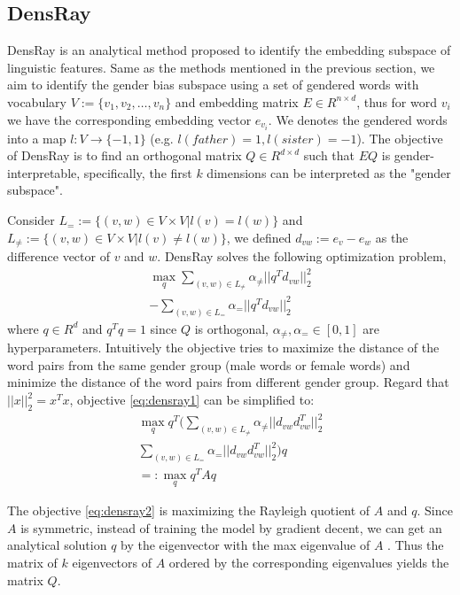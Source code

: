 \subsection{DensRay}
DensRay is an analytical method proposed to identify the embedding subspace of linguistic features.
Same as the methods mentioned in the previous section, we aim to identify the gender bias subspace using a set of gendered words with vocabulary $V:=\{v_1,v_2,\dots,v_n\}$ and embedding matrix $E \in R^{n\times d}$, thus for word $v_i$ we have the corresponding embedding vector $e_{v_i}$. We denotes the gendered words into a map $l:V\to \{-1,1\}$ (e.g. $l(father)=1,l(sister)=-1 $). The objective of DensRay is to find an orthogonal matrix $Q\in R^{d\times d}$ such that $EQ$ is gender-interpretable, specifically, the first $k$ dimensions can be interpreted as the "gender subspace".

Consider $L_{=}:=\{(v,w)\in V\times V|l(v)=l(w)\}$ and $L_{\neq}:=\{(v,w)\in V\times V|l(v)\neq l(w)\}$, we defined $d_{vw}:=e_v-e_w$ as the difference vector of $v$ and $w$. DensRay solves the following optimization problem,
\begin{eqnarray}
    \mathop{max}\limits_{q} 
    \sum_{(v,w)\in L_{\neq}}\alpha_{\neq}||q^Td_{vw}||^2_2\nonumber\\
    -\sum_{(v,w)\in L_{=}}\alpha_{=}||q^Td_{vw}||^2_2
\label{eq:densray1}
\end{eqnarray}
where $q\in R^d$ and $q^Tq=1$ since $Q$ is orthogonal, $\alpha_{\neq},\alpha_{=}\in [0,1]$ are hyperparameters. Intuitively the objective tries to maximize the distance of the word pairs from the same gender group (male words or female words) and minimize the distance of the word pairs from different gender group. Regard that $||x||^2_2=x^Tx$, objective \ref{eq:densray1} can be simplified to:
\begin{eqnarray}
    \mathop{max}\limits_{q} q^T(
    \sum_{(v,w)\in L_{\neq}}\alpha_{\neq}||d_{vw}d_{vw}^T||^2_2\nonumber\\
    \sum_{(v,w)\in L_{=}}\alpha_{=}||d_{vw}d_{vw}^T||^2_2)q\nonumber\\
    =:\mathop{max}\limits_{q} q^TAq
\label{eq:densray2}
\end{eqnarray}

The objective \ref{eq:densray2} is maximizing the Rayleigh quotient of $A$ and $q$. Since $A$ is symmetric, instead of training the model by gradient decent, we can get an analytical solution $q$ by the eigenvector with the max eigenvalue of $A$ \citep{horn1990matrix}. Thus the matrix of $k$ eigenvectors of $A$ ordered by the corresponding eigenvalues yields the matrix $Q$.
